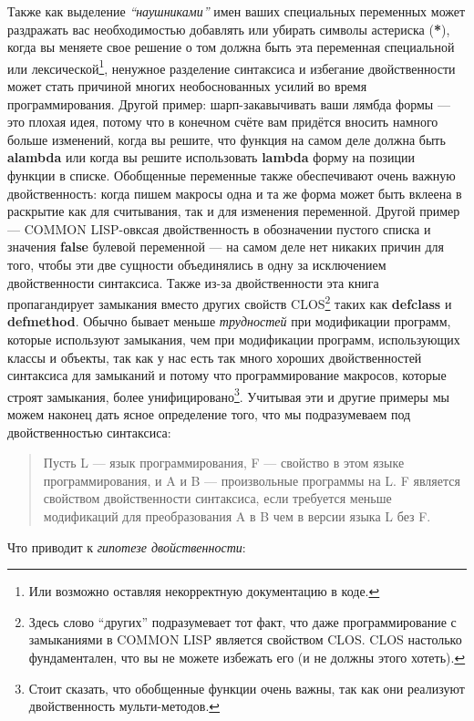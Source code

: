 Также как выделение \emph{``наушниками''} имен ваших специальных переменных может раздражать вас необходимостью добавлять или убирать символы астериска (\textbf{*}), когда вы меняете свое решение о том должна быть эта переменная специальной или лексической\footnote{Или возможно оставляя некорректную документацию в коде.}, ненужное разделение синтаксиса и избегание двойственности может стать причиной многих необоснованных усилий во время программирования. Другой пример: шарп-закавычивать ваши лямбда формы --- это плохая идея, потому что в конечном счёте вам придётся вносить намного больше изменений, когда вы решите, что функция на самом деле должна быть \textbf{alambda} или когда вы решите использовать \textbf{lambda} форму на позиции функции в списке. Обобщенные переменные также обеспечивают очень важную двойственность: когда пишем макросы одна и та же форма может быть вклеена в раскрытие как для считывания, так и для изменения переменной. Другой пример --- COMMON LISP-овксая двойственность в обозначении пустого списка и значения \textbf{false} булевой переменной --- на самом деле нет никаких причин для того, чтобы эти две сущности объединялись в одну за исключением двойственности синтаксиса. Также из-за двойственности эта книга пропагандирует замыкания вместо других свойств CLOS\footnote{Здесь слово ``других'' подразумевает тот факт, что даже программирование с замыканиями в COMMON LISP является свойством CLOS. CLOS настолько фундаментален, что вы не можете избежать его (и не должны этого хотеть).} таких как \textbf{defclass} и \textbf{defmethod}. Обычно бывает меньше \emph{трудностей} при модификации программ, которые используют замыкания, чем при модификации программ, использующих классы и объекты, так как у нас есть так много хороших двойственностей синтаксиса для замыканий и потому что программирование макросов, которые строят замыкания, более унифицировано\footnote{Стоит сказать, что обобщенные функции очень важны, так как они реализуют двойственность мульти-методов.}. Учитывая эти и другие примеры мы можем наконец дать ясное определение того, что мы подразумеваем под двойственностью синтаксиса:

\begin{quote}
Пусть L --- язык программирования, F --- свойство в этом языке программирования, и A и B --- произвольные программы на L. F является свойством двойственности синтаксиса, если требуется меньше модификаций для преобразования A в B чем в версии языка L без F.
\end{quote}

Что приводит к \emph{гипотезе двойственности}:

